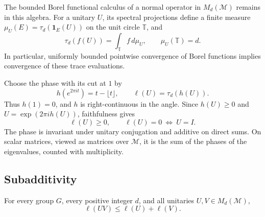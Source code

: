 The bounded Borel functional calculus of a normal operator in
$M_d(\mathcal M)$ remains in this algebra.  For a unitary $U$, its spectral
projections define a finite measure
$\mu_U(E)=\tau_d(\mathbf1_E(U))$ on the unit circle $\mathbb T$, and
\begin{equation}\label{eq:phase-spectral-integral}
 \tau_d(f(U))=\int_{\mathbb T}f\,d\mu_U,
 \qquad \mu_U(\mathbb T)=d.
\end{equation}
In particular, uniformly bounded pointwise convergence of Borel functions
implies convergence of these trace evaluations.

Choose the phase with its cut at $1$ by
\begin{equation}\label{eq:phase-definition}
 h(e^{2\pi i t})=t-\lfloor t\rfloor,\qquad
 \ell(U)=\tau_d(h(U)).
\end{equation}
Thus $h(1)=0$, and $h$ is right-continuous in the angle.  Since
$h(U)\geq0$ and $U=\exp(2\pi i h(U))$, faithfulness gives
\begin{equation}\label{eq:phase-faithful}
 \ell(U)\geq0,\qquad \ell(U)=0\ \Longleftrightarrow\ U=I.
\end{equation}
The phase is invariant under unitary conjugation and additive on direct
sums.  On scalar matrices, viewed as matrices over $\mathcal M$, it is the
sum of the phases of the eigenvalues, counted with multiplicity.

\subsection{Subadditivity}

\begin{lemma}\label{lem:phase-subadditivity}
For every group $G$, every positive integer $d$, and all unitaries
$U,V\in M_d(\mathcal M)$,
\[
 \ell(UV)\leq\ell(U)+\ell(V).
\]
\end{lemma}

